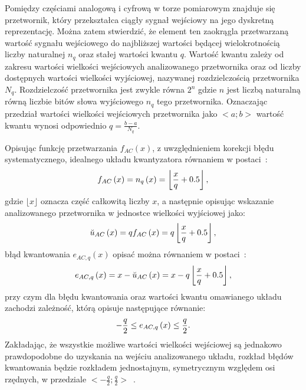 Pomiędzy częściami analogową i cyfrową w torze pomiarowym znajduje się przetwornik, który przekształca ciągły sygnał wejściowy na jego dyskretną reprezentację. Można zatem stwierdzić, że element ten zaokrągla przetwarzaną wartość sygnału wejściowego do najbliższej wartości będącej wielokrotnością liczby naturalnej $n_{q}$ oraz stałej wartości kwantu $q$. Wartość kwantu zależy od zakresu wartości wielkości wejściowych analizowanego przetwornika oraz od liczby dostępnych wartości wielkości wyjściowej, nazywanej rozdzielczością przetwornika $N_{q}$. Rozdzielczość przetwornika jest zwykle równa $2^{n}$ gdzie $n$ jest liczbą naturalną równą liczbie bitów słowa wyjściowego $n_{q}$ tego przetwornika. Oznaczając przedział wartości wielkości wejściowych przetwornika jako $<a;b>$ wartość kwantu wynosi odpowiednio $q = \frac{b - a}{N_{q}}$.

Opisując funkcję przetwarzania $f_{AC}(x)$, z uwzględnieniem korekcji błędu systematycznego, idealnego układu kwantyzatora równaniem w postaci~\cite{jakubiec_system}:
\begin{equation}
f_{AC} \left(x\right) = n_{q} \left(x\right) = \left\lfloor \frac{x}{q} + 0.5 \right\rfloor \label{eq:adc_function},
\end{equation}
gdzie $\lfloor x \rfloor$ oznacza część całkowitą liczby $x$, a następnie opisując wskazanie analizowanego przetwornika w jednostce wielkości wyjściowej jako:
\begin{equation}
\breve{u}_{AC} \left(x\right) = q f_{AC} \left(x\right) = q \left\lfloor \frac{x}{q} + 0.5 \right\rfloor \label{eq:adc_output},
\end{equation}
błąd kwantowania $e_{AC,q}(x)$ opisać można równaniem w postaci~\cite{jakubiec_system}:
\begin{equation}
e_{AC,q} \left(x\right) = x - \breve{u}_{AC} \left(x\right) = x - q \left\lfloor \frac{x}{q} + 0.5 \right\rfloor \label{eq:adc_qerror},
\end{equation}
przy czym dla błędu kwantowania oraz wartości kwantu omawianego układu zachodzi zależność, którą opisuje następujące równanie:
\begin{equation}
-\frac{q}{2} \le e_{AC,q} \left(x\right) \le \frac{q}{2} \label{eq:adc_qerrrange}.
\end{equation}
Zakładając, że wszystkie możliwe wartości wielkości wejściowej są jednakowo prawdopodobne do uzyskania na wejściu analizowanego układu, rozkład błędów kwantowania będzie rozkładem jednostajnym, symetrycznym względem osi rzędnych, w przedziale $<-\frac{q}{2};\frac{q}{2}>$~\cite{jakubiec_system, sienkowski_kwant}.

